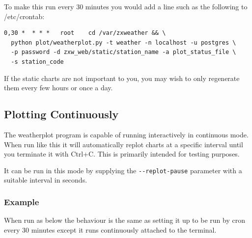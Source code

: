 \documentclass[a4paper,10pt,draft]{book}
\begin{document}
To make this run every 30 minutes you would add a line such as the following to /etc/crontab:
\begin{verbatim}
0,30 *  * * *   root    cd /var/zxweather && \
  python plot/weatherplot.py -t weather -n localhost -u postgres \
  -p password -d zxw_web/static/station_name -a plot_status_file \
  -s station_code
\end{verbatim}

If the static charts are not important to you, you may wish to only regenerate them every few hours or once a day.

\subsection{Plotting Continuously}

The weatherplot program is capable of running interactively in continuous mode. When run like this it will automatically replot charts at a specific interval until you terminate it with Ctrl+C. This is primarily intended for testing purposes.

It can be run in this mode by supplying the \verb|--replot-pause| parameter
with a suitable interval in seconds.

\subsubsection{Example}

When run as below the behaviour is the same as setting it up to be run by cron every 30 minutes except it runs continuously attached to the terminal.
\end{document}
